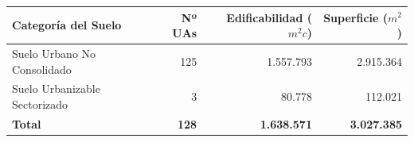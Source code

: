\begin{tabular}{lrrr}
  \toprule
  \textbf{Categoría del Suelo} & \textbf{Nº UAs} & \textbf{Edificabilidad ($m^2c$)} & \textbf{Superficie ($m^2$)} \\
  \midrule
  Suelo Urbano No Consolidado & 125 & 1.557.793 & 2.915.364 \\
  Suelo Urbanizable Sectorizado & 3 & 80.778 & 112.021 \\
  \midrule
  \textbf{Total} & \textbf{128} & \textbf{1.638.571} & \textbf{3.027.385} \\
  \bottomrule
\end{tabular}
